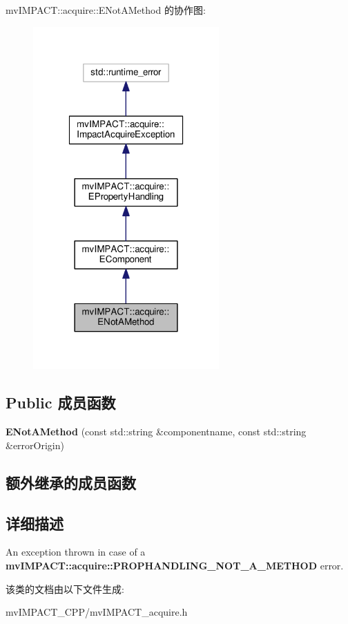 mv\+I\+M\+P\+A\+C\+T\+:\+:acquire\+:\+:E\+Not\+A\+Method 的协作图\+:
\nopagebreak
\begin{figure}[H]
\begin{center}
\leavevmode
\includegraphics[width=202pt]{classmv_i_m_p_a_c_t_1_1acquire_1_1_e_not_a_method__coll__graph}
\end{center}
\end{figure}
\subsection*{Public 成员函数}
\begin{DoxyCompactItemize}
\item 
\hypertarget{classmv_i_m_p_a_c_t_1_1acquire_1_1_e_not_a_method_a0b2ea86de8cf22533bebd735f5dde4ff}{{\bfseries E\+Not\+A\+Method} (const std\+::string \&componentname, const std\+::string \&error\+Origin)}\label{classmv_i_m_p_a_c_t_1_1acquire_1_1_e_not_a_method_a0b2ea86de8cf22533bebd735f5dde4ff}

\end{DoxyCompactItemize}
\subsection*{额外继承的成员函数}


\subsection{详细描述}
An exception thrown in case of a {\bfseries mv\+I\+M\+P\+A\+C\+T\+::acquire\+::\+P\+R\+O\+P\+H\+A\+N\+D\+L\+I\+N\+G\+\_\+\+N\+O\+T\+\_\+\+A\+\_\+\+M\+E\+T\+H\+O\+D} error. 

该类的文档由以下文件生成\+:\begin{DoxyCompactItemize}
\item 
mv\+I\+M\+P\+A\+C\+T\+\_\+\+C\+P\+P/mv\+I\+M\+P\+A\+C\+T\+\_\+acquire.\+h\end{DoxyCompactItemize}
